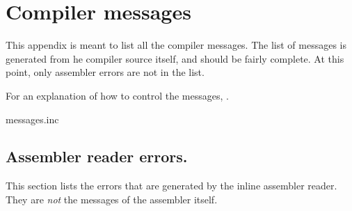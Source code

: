 \chapter{Compiler messages}
\label{ch:ErrorMessages}
This appendix is meant to list all the compiler messages. The list of
messages is generated from he compiler source itself, and should be fairly
complete. At this point, only assembler errors are not in the list.

For an explanation of how to control the messages, .

\ifx\HCode\undefined
{}
\fi
 {messages.inc}

\section{Assembler reader errors.}

This section lists the errors that are generated by the inline assembler reader.
They are {\em not} the messages of the assembler itself.

